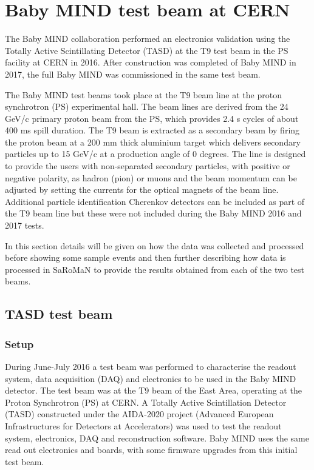 \chapter{Baby MIND test beam at CERN}
\label{c:Testbeam}

The Baby MIND collaboration performed an electronics validation using the Totally Active Scintillating Detector (TASD) at the T9 test beam in the PS facility at CERN in 2016. After construction was completed of Baby MIND in 2017, the full Baby MIND was commissioned in the same test beam.

The Baby MIND test beams took place at the T9 beam line at the proton synchrotron (PS) experimental hall. The beam lines are derived from the 24 GeV/c primary proton beam from the PS, which provides 2.4 s cycles of about 400 ms spill duration. The T9 beam is extracted as a secondary beam by firing the proton beam at a 200 mm thick aluminium target which delivers secondary particles up to 15 GeV/c at a production angle of 0 degrees. The line is designed to provide the users with non-separated secondary particles, with positive or negative polarity, as hadron (pion) or muons and the beam momentum can be adjusted by setting the currents for the optical magnets of the beam line. Additional particle identification Cherenkov detectors can be included as part of the T9 beam line but these were not included during the Baby MIND 2016 and 2017 tests.

In this section details will be given on how the data was collected and processed before showing some sample events and then further describing how data is processed in SaRoMaN to provide the results obtained from each of the two test beams.


\section{TASD test beam}

\subsection{Setup}
During June-July 2016 a test beam was performed to characterise the readout system, data acquisition (DAQ) and electronics to be used in the Baby MIND detector. The test beam was at the T9 beam of the East Area, operating at the Proton Synchrotron (PS) at CERN. A Totally Active Scintillation Detector (TASD) constructed under the AIDA-2020 project (Advanced European Infrastructures for Detectors at Accelerators) was used to test the readout system, electronics, DAQ and reconstruction software. Baby MIND uses the same read out electronics and boards, with some firmware upgrades from this initial test beam.

